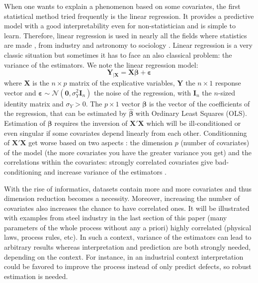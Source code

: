 \documentclass[11pt,a4paper]{article}
\begin{document}
When one wants to explain a phenomenon based on some covariates, the first statistical method tried frequently is the linear regression. It provides a predictive model with a good interpretability even  for non-statistician and is simple to learn. Therefore, linear regression is used in nearly all the fields where statistics are made \cite{montgomery2012introduction}, from industry and astronomy \cite{isobe1990linear} to sociology \cite{longford2012revision}.
Linear regression is a very classic situation but sometimes it has to face an also classical problem: the variance of the estimators. We note the linear regression model:
\begin{equation}
		\boldsymbol{Y}_{|\boldsymbol{X}}=\boldsymbol{X}\boldsymbol{\beta} + \boldsymbol{\varepsilon}
	\end{equation}
	where $\boldsymbol{X}$ is the $n\times p$ matrix of the explicative variables, $\boldsymbol{Y}$ the  $n\times 1$ response vector and $\boldsymbol{\varepsilon} \sim \mathcal{N}(\boldsymbol{0},\sigma_Y^2\boldsymbol{I}_n)$ the noise of the regression, with $\boldsymbol{I}_n$ the $n$-sized identity matrix and $\sigma_Y >0$. The $p\times 1$ vector $\boldsymbol{\beta}$ is the vector of the coefficients of the regression, that can be estimated by $\hat{\boldsymbol{\beta}}$ with Ordinary Least Squares (\textsc{OLS}). %
	Estimation of $\boldsymbol{\beta}$ requires the inversion of $\boldsymbol{X}'\boldsymbol{X}$ which will be ill-conditioned or even singular if some covariates depend linearly from each other. 
Conditionning of $\boldsymbol{X}'\boldsymbol{X}$ get worse based on two aspects : the dimension $p$ (number of covariates) of the model (the more covariates you have the greater variance you get)
	 and the correlations within the covariates: strongly correlated covariates give bad-conditioning and increase variance of the estimators .

	With the rise of informatics, datasets contain more and more covariates and thus dimension reduction becomes a necessity. Moreover, increasing the number of covariates also increases the chance to have correlated ones. It will be illustrated with examples from steel industry in the last section of this paper (many parameters of the whole process without any a priori) highly correlated (physical laws, process rules, etc). 
	 In such a context, variance of the estimators can lead to arbitrary results whereas interpretation and prediction are both strongly needed, depending on the context. For instance, in an industrial context interpretation could be favored to improve the process instead of only predict defects, so robust estimation is needed.
		~\\	~\\
		
\end{document}
